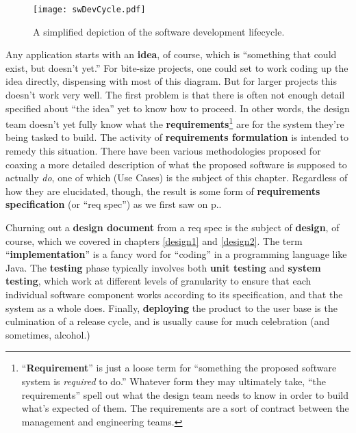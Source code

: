 \begin{figure}
\centering
\texttt{[image: swDevCycle.pdf]}
\caption{A simplified depiction of the software development lifecycle.}
\label{fig:swDevCycle}
\end{figure}

Any application starts with an \textbf{idea}, of course, which is ``something
that could exist, but doesn't yet.'' For bite-size projects, one could set to
work coding up the idea directly, dispensing with most of this diagram. But
for larger projects this doesn't work very well. The first problem is that
there is often not enough detail specified about ``the idea'' yet to know how
to proceed. In other words, the design team doesn't yet fully know what the
\textbf{requirements}\footnote{``\textbf{Requirement}'' is just a loose term
for ``something the proposed software system is \textit{required} to do.''
Whatever form they may ultimately take, ``the requirements'' spell out what
the design team needs to know in order to build what's expected of them. The
requirements are a sort of contract between the management and engineering
teams.} are for the system they're being tasked to build. The activity of
\textbf{requirements formulation} is intended to remedy this situation. There
have been various methodologies proposed for coaxing a more detailed
description of what the proposed software is supposed to actually \textit{do},
one of which (Use Cases) is the subject of this chapter. Regardless of how
they are elucidated, though, the result is some form of \textbf{requirements
specification} (or ``req spec'') as we first saw on p.\pageref{reqSpec}.

Churning out a \textbf{design document} from a req spec is the subject of
\textbf{design}, of course, which we covered in chapters \ref{design1} and
\ref{design2}. The term ``\textbf{implementation}'' is a fancy word for
``coding'' in a programming language like Java. The \textbf{testing} phase
typically involves both \textbf{unit testing} and \textbf{system testing},
which work at different levels of granularity to ensure that each individual
software component works according to its specification, and that the system
as a whole does. Finally, \textbf{deploying} the product to the user base is
the culmination of a release cycle, and is usually cause for much celebration
(and sometimes, alcohol.)

